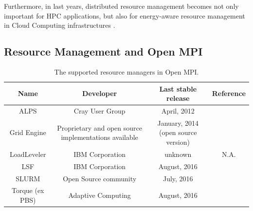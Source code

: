 Furthermore, in last years, distributed resource management becomes not only
important for HPC applications, but also for energy-aware resource management
in Cloud Computing infrastructures \cite{beloglazov2012energy}. 

\subsection{Resource Management and Open MPI}
\begin{table}[ht!b]
\centering
\begin{tabular}{ c|c|c|c}

\textbf{Name} 
& 
\parbox{4.5cm}{\vspace{.5\baselineskip}
\centering \textbf{Developer} 
\vspace{.5\baselineskip}}
& \textbf{Last stable release} 
& \textbf{Reference} \\ \hline

ALPS 
& 
\parbox{4cm}{\vspace{.5\baselineskip}
\centering Cray User Group 
\vspace{.5\baselineskip}}
& April, 2012
& \cite{karo2006application}
\\ \hline

Grid Engine
&  
\parbox{4.5cm}{\vspace{.5\baselineskip}
\centering Proprietary and open source implementations available 
 \vspace{.5\baselineskip}}
&
\parbox{3cm}{\vspace{.5\baselineskip}
\centering  January, 2014 (open source version)
 \vspace{.5\baselineskip}}
& \cite{gentzsch2001sun}
\\ \hline

LoadLeveler
& 
\parbox{4cm}{\vspace{.5\baselineskip}
\centering IBM Corporation 
\vspace{.5\baselineskip}}
& unknown
& N.A.
\\ \hline

LSF
& 
\parbox{4cm}{\vspace{.5\baselineskip}
\centering IBM Corporation 
\vspace{.5\baselineskip}}
& August, 2016
& \cite{zhou1992lsf}
\\ \hline

SLURM
& 
\parbox{4cm}{\vspace{.5\baselineskip}
\centering Open Source community
\vspace{.5\baselineskip}}
& July, 2016
& \cite{yoo2003slurm}
\\ \hline

Torque (ex PBS)
& 
\parbox{4cm}{\vspace{.5\baselineskip}
\centering Adaptive Computing
\vspace{.5\baselineskip}}
& August, 2016
& \cite{staples2006torque}

\end{tabular}

\caption[Supported resource managers in Open MPI]{The supported resource managers in Open MPI.}
\label{tab:rmopenmpi}

\end{table}

